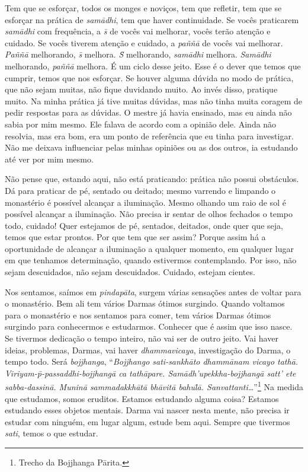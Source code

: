 Tem que se esforçar, todos os monges e noviços, tem que refletir,
tem que se esforçar na prática de \textit{sam\=adhi}, tem que haver
continuidade. Se vocês praticarem \textit{sam\=adhi} com frequência, a
\textit{s\=\ila} de vocês vai melhorar, vocês terão atenção e cuidado.
Se vocês tiverem atenção e cuidado, a \textit{paññ\=a} de vocês vai
melhorar. \textit{Paññ\=a} melhorando, \textit{s\=\ila} melhora.
\textit{S\=\ila} melhorando, \textit{sam\=adhi} melhora.
\textit{Sam\=adhi} melhorando, \textit{paññ\=a} melhora. É um ciclo
desse jeito. Esse é o dever que temos que cumprir, temos que nos
esforçar. Se houver alguma dúvida no modo de prática, que não sejam
muitas, não fique duvidando muito. Ao invés disso, pratique muito. Na
minha prática já tive muitas dúvidas, mas não tinha muita coragem de
pedir respostas para as dúvidas. O mestre já havia ensinado, mas eu
ainda não sabia por mim mesmo. Ele falava de acordo com a opinião dele.
Ainda não resolvia, mas era bom, era um ponto de referência que eu
tinha para investigar. Não me deixava influenciar pelas minhas opiniões
ou as dos outros, ia estudando até ver por mim mesmo.

Não pense que, estando aqui, não está praticando: prática não possui
obstáculos. Dá para praticar de pé, sentado ou deitado; mesmo varrendo
e limpando o monastério é possível alcançar a iluminação. Mesmo olhando
um raio de sol é possível alcançar a iluminação. Não precisa ir sentar
de olhos fechados o tempo todo, cuidado! Quer estejamos de pé,
sentados, deitados, onde quer que seja, temos que estar prontos. Por
que tem que ser assim? Porque assim há a oportunidade de alcançar a
iluminação a qualquer momento, em qualquer lugar em que tenhamos
determinação, quando estivermos contemplando. Por isso, não sejam
descuidados, não sejam descuidados. Cuidado, estejam cientes. 

Nos sentamos, saímos em \textit{pindap\=ata}, surgem várias
sensações antes de voltar para o monastério. Bem ali tem vários Darmas
ótimos surgindo. Quando voltamos para o monastério e nos sentamos para
comer, tem vários Darmas ótimos surgindo para conhecermos e estudarmos.
Conhecer que é assim que isso nasce. Se tivermos dedicação o tempo
inteiro, não vai ser de outro jeito. Vai haver ideias, problemas,
Darmas, vai haver \textit{dhammavicaya}, investigação do Darma, o tempo
todo. Será \textit{bojjhanga}, “\textit{Bojjhango sati-sankh\=ato
dhamm\=anam vicayo tath\=a. Viriyam-p\=\iti-passaddhi-bojjhang\=a ca
tath\=apare. Sam\=adh’upekkha-bojjhang\=a satt’ ete sabba-dassin\=a.
Munin\=a sammadakkh\=at\=a bh\=avit\=a bahul\=\ikat\=a.
Sanvattanti…}”\footnote{Trecho da Bojjhanga P\=arita.} Na medida que
estudamos, somos eruditos. Estamos estudando alguma coisa? Estamos
estudando esses objetos mentais. Darma vai nascer nesta mente, não
precisa ir estudar com ninguém, em lugar algum, estude bem aqui. Sempre
que tivermos \textit{sati}, temos o que estudar. 

